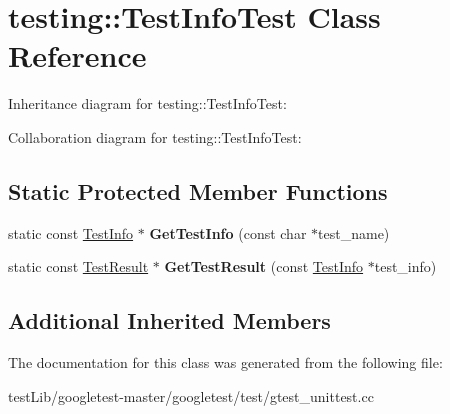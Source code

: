\hypertarget{classtesting_1_1TestInfoTest}{}\section{testing\+:\+:Test\+Info\+Test Class Reference}
\label{classtesting_1_1TestInfoTest}


Inheritance diagram for testing\+:\+:Test\+Info\+Test\+:


Collaboration diagram for testing\+:\+:Test\+Info\+Test\+:
\subsection*{Static Protected Member Functions}
\begin{DoxyCompactItemize}
\item 
\mbox{\label{classtesting_1_1TestInfoTest_a4140c1302bf53c7f1375a23923624f04}} 
static const \hyperlink{classtesting_1_1TestInfo}{Test\+Info} $\ast$ {\bfseries Get\+Test\+Info} (const char $\ast$test\+\_\+name)
\item 
\mbox{\label{classtesting_1_1TestInfoTest_a154b3679b1aa00ad037ce46eb60d18c3}} 
static const \hyperlink{classtesting_1_1TestResult}{Test\+Result} $\ast$ {\bfseries Get\+Test\+Result} (const \hyperlink{classtesting_1_1TestInfo}{Test\+Info} $\ast$test\+\_\+info)
\end{DoxyCompactItemize}
\subsection*{Additional Inherited Members}


The documentation for this class was generated from the following file\+:\begin{DoxyCompactItemize}
\item 
test\+Lib/googletest-\/master/googletest/test/gtest\+\_\+unittest.\+cc\end{DoxyCompactItemize}
